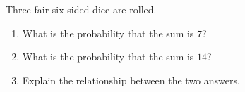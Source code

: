 Three fair six-sided dice are rolled.
\begin{enumerate}
\item[(a)] What is the probability that the sum is $7$?
\item[(b)] What is the probability that the sum is $14$?
\item[(c)] Explain the relationship between the two answers.
\end{enumerate}
